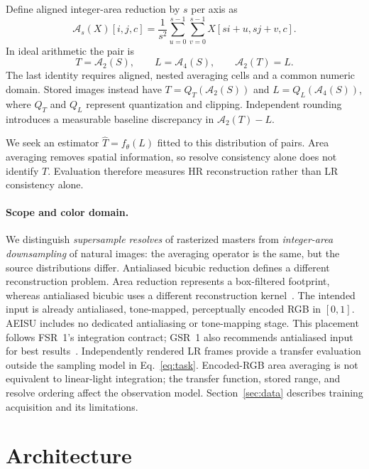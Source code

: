 \documentclass[10pt,twocolumn,letterpaper]{article}
\newcommand{\model}{AEISU}
\newcommand{\A}{\mathcal{A}}
\begin{document}
Define aligned integer-area reduction by $s$ per axis as
\begin{equation}
 \A_s(X)[i,j,c]=\frac{1}{s^2}
 \sum_{u=0}^{s-1}\sum_{v=0}^{s-1}X[si+u,sj+v,c].
 \label{eq:area}
\end{equation}
In ideal arithmetic the pair is
\begin{equation}
 T=\A_2(S),\qquad L=\A_4(S),\qquad \A_2(T)=L.
 \label{eq:task}
\end{equation}
The last identity requires aligned, nested averaging cells and a common numeric domain.
Stored images instead have $T=Q_T(\A_2(S))$ and $L=Q_L(\A_4(S))$, where $Q_T$ and $Q_L$ represent quantization and clipping.
Independent rounding introduces a measurable baseline discrepancy in $\A_2(T)-L$.

We seek an estimator $\widehat T=f_\theta(L)$ fitted to this distribution of pairs.
Area averaging removes spatial information, so resolve consistency alone does not identify $T$.
Evaluation therefore measures HR reconstruction rather than LR consistency alone.

\paragraph{Scope and color domain.}
We distinguish \emph{supersample resolves} of rasterized masters from \emph{integer-area downsampling} of natural images: the averaging operator is the same, but the source distributions differ.
Antialiased bicubic reduction defines a different reconstruction problem.
Area reduction represents a box-filtered footprint, whereas antialiased bicubic uses a different reconstruction kernel~\cite{pharr2023pbrt,mathworksresize}.
The intended input is already antialiased, tone-mapped, perceptually encoded RGB in $[0,1]$.
\model{} includes no dedicated antialiasing or tone-mapping stage.
This placement follows FSR~1's integration contract; GSR~1 also recommends antialiased input for best results~\cite{amd2021fsr,qualcomm2023gsr}.
Independently rendered LR frames provide a transfer evaluation outside the sampling model in Eq.~\eqref{eq:task}.
Encoded-RGB area averaging is not equivalent to linear-light integration; the transfer function, stored range, and resolve ordering affect the observation model.
Section~\ref{sec:data} describes training acquisition and its limitations.

\section{Architecture}
\label{sec:method}
\end{document}
